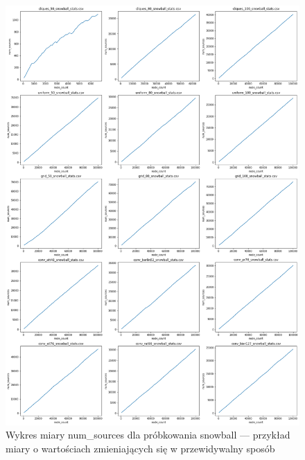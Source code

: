 \begin{figure}[]
    \centering
    \includegraphics[width=\textwidth]{chapters/experiments/img/merged_plots/main_snowball/num_sources.png}
    \caption{Wykres miary num\_sources dla próbkowania snowball --- przykład miary o wartościach zmieniających się w przewidywalny sposób}
    \label{fig:included_num_sources}
\end{figure}

